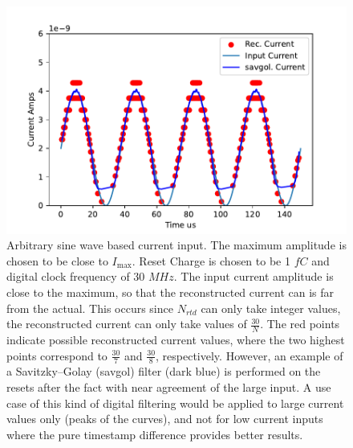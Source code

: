 \begin{figure}[]
\centering
\includegraphics[width=\textwidth]{images/savgol.pdf}
\caption{Arbitrary sine wave based current input.
The maximum amplitude is chosen to be close to $I_{\mathrm{max}}$.
Reset Charge is chosen to be 1 $\unit{fC}$ and digital clock frequency of 30 $\unit{MHz}$.
The input current amplitude is close to the maximum, so that the reconstructed current can is far from the actual.
This occurs since $N_{rtd}$ can only take integer values, the reconstructed current can only take values of $\frac{30}{N}$.
The red points indicate possible reconstructed current values, where the two highest points correspond to $\frac{30}{7}$ and $\frac{30}{8}$, respectively.
However, an example of a Savitzky–Golay (savgol) filter (dark blue) is performed on the resets after the fact with near agreement of the large input.
A use case of this kind of digital filtering would be applied to large current values only (peaks of the curves), and not for low current inputs where the pure timestamp difference provides better results.}
\label{fig:savgol}
\end{figure}

